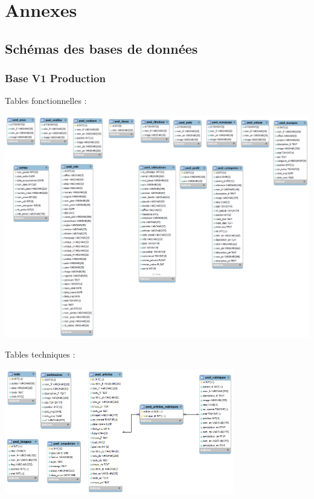\documentclass[a4paper,10pt]{article}
\begin{document}
\newpage
\appendix
\section{Annexes}

\subsection{Schémas des bases de données}

\subsubsection{Base V1 Production}
\label{app:dbv1}
Tables fonctionnelles :

\begin{center}\includegraphics[width=\textwidth]{LORDv1_Tables_fonctionnelles.png}\end{center}

Tables techniques :

\begin{center}\includegraphics[width=0.75\textwidth]{LORDv1_Tables_techniques.png}\end{center}
\end{document}
